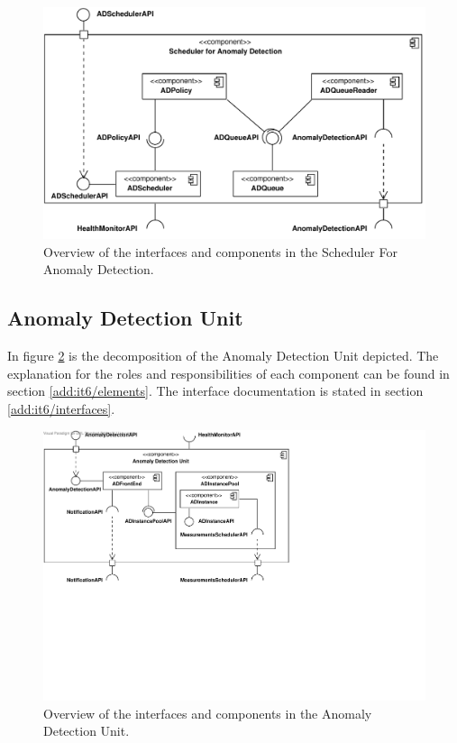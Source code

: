 \begin{figure}[H]
	\begin{centering}
		\includegraphics[width=\textwidth]{figs/add-it5-interfaces.pdf}
		\caption{Overview of the interfaces and components in the Scheduler For
		Anomaly Detection.}
		\label{fig:final-architecture/it5}
	\end{centering}
\end{figure}

\subsection{Anomaly Detection Unit}

\npar In figure \ref{fig:final-architecture/it6} is the decomposition of the
Anomaly Detection Unit depicted. The explanation for the roles and
responsibilities of each component can be found in section
\ref{add:it6/elements}. The interface documentation is stated in section
\ref{add:it6/interfaces}.

\begin{figure}[H]
	\begin{centering}
		\includegraphics[width=\textwidth]{figs/add-it6-interfaces.pdf}
		\caption{Overview of the interfaces and components in the Anomaly Detection
		Unit.}
		\label{fig:final-architecture/it6}
	\end{centering}
\end{figure}

